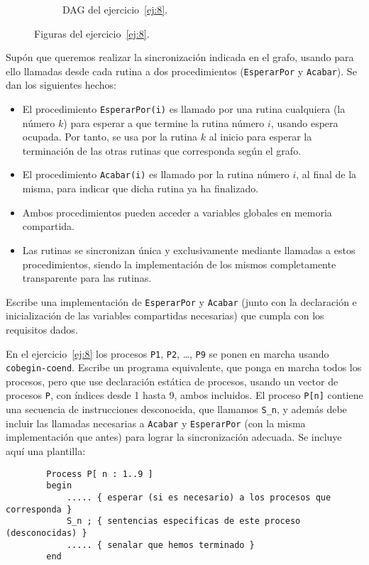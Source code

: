 \begin{ejercicio}
\begin{figure}
\begin{subfigure}{0.45\textwidth}
{\begin{tikzpicture}[
                    node/.style={circle, draw, minimum size=0.5cm},
                    edge/.style={-stealth}
                    ]
                \end{tikzpicture}
            }
            \caption{DAG del ejercicio~\ref{ej:8}.}
            \label{fig:ej8_grafo}
        \end{subfigure}
        \caption{Figuras del ejercicio~\ref{ej:8}.}
    \end{figure}

    Supón que queremos realizar la sincronización indicada en el grafo, usando para ello llamadas
    desde cada rutina a dos procedimientos (\verb|EsperarPor| y \verb|Acabar|). Se dan los siguientes hechos:
    \begin{itemize}
        \item El procedimiento \verb|EsperarPor(i)| es llamado por una rutina cualquiera (la número $k$) para esperar a que termine la rutina número $i$, usando espera ocupada. Por tanto, se usa por la rutina $k$ al inicio para esperar la terminación de las otras rutinas que corresponda según el grafo.
        \item El procedimiento \verb|Acabar(i)| es llamado por la rutina número $i$, al final de la misma, para indicar que dicha rutina ya ha finalizado.
        \item Ambos procedimientos pueden acceder a variables globales en memoria compartida.
        \item Las rutinas se sincronizan única y exclusivamente mediante llamadas a estos procedimientos, siendo la implementación de los mismos completamente transparente para las rutinas.
    \end{itemize}
    Escribe una implementación de \verb|EsperarPor| y \verb|Acabar| (junto con la declaración e inicialización de las variables compartidas necesarias) que cumpla con los requisitos dados.
    
\end{ejercicio}


\begin{ejercicio}
    En el ejercicio~\ref{ej:8} los procesos \verb|P1|, \verb|P2|, \ldots, \verb|P9| se ponen en marcha usando \verb|cobegin-coend|.
    Escribe un programa equivalente, que ponga en marcha todos los procesos, pero que use declaración
    estática de procesos, usando un vector de procesos \verb|P|, con índices desde 1 hasta 9, ambos incluidos. El proceso \verb|P[n]| contiene una secuencia de instrucciones desconocida, que llamamos \verb|S_n|, y además debe incluir las llamadas necesarias a \verb|Acabar| y \verb|EsperarPor| (con la misma implementación que antes) para lograr la sincronización adecuada. Se incluye aquí una plantilla:
    \begin{verbatim}
        Process P[ n : 1..9 ]
        begin
            ..... { esperar (si es necesario) a los procesos que corresponda }
            S_n ; { sentencias especificas de este proceso (desconocidas) }
            ..... { senalar que hemos terminado }
        end
    \end{verbatim}
\end{ejercicio}


